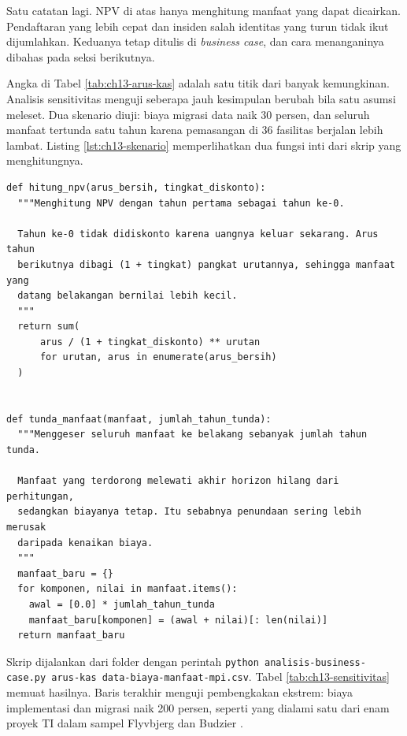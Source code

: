 Satu catatan lagi. NPV di atas hanya menghitung manfaat yang dapat dicairkan.
Pendaftaran yang lebih cepat dan insiden salah identitas yang turun tidak
ikut dijumlahkan. Keduanya tetap ditulis di \textit{business case}, dan cara
menanganinya dibahas pada seksi berikutnya.

\begin{pendalaman}[title={Pendalaman Teknis (opsional): Analisis Sensitivitas}]
Angka di Tabel \ref{tab:ch13-arus-kas} adalah satu titik dari banyak
kemungkinan. Analisis sensitivitas menguji seberapa jauh kesimpulan berubah
bila satu asumsi meleset. Dua skenario diuji: biaya migrasi data naik 30
persen, dan seluruh manfaat tertunda satu tahun karena pemasangan di 36
fasilitas berjalan lebih lambat. Listing \ref{lst:ch13-skenario} memperlihatkan
dua fungsi inti dari skrip yang menghitungnya.

\begin{lstlisting}[style=ch13python, caption={Fungsi penundaan manfaat dan NPV, tersedia di \berkas{sources/chapter13/analisis-business-case.py}}, label={lst:ch13-skenario}]
def hitung_npv(arus_bersih, tingkat_diskonto):
  """Menghitung NPV dengan tahun pertama sebagai tahun ke-0.

  Tahun ke-0 tidak didiskonto karena uangnya keluar sekarang. Arus tahun
  berikutnya dibagi (1 + tingkat) pangkat urutannya, sehingga manfaat yang
  datang belakangan bernilai lebih kecil.
  """
  return sum(
      arus / (1 + tingkat_diskonto) ** urutan
      for urutan, arus in enumerate(arus_bersih)
  )


def tunda_manfaat(manfaat, jumlah_tahun_tunda):
  """Menggeser seluruh manfaat ke belakang sebanyak jumlah tahun tunda.

  Manfaat yang terdorong melewati akhir horizon hilang dari perhitungan,
  sedangkan biayanya tetap. Itu sebabnya penundaan sering lebih merusak
  daripada kenaikan biaya.
  """
  manfaat_baru = {}
  for komponen, nilai in manfaat.items():
    awal = [0.0] * jumlah_tahun_tunda
    manfaat_baru[komponen] = (awal + nilai)[: len(nilai)]
  return manfaat_baru
\end{lstlisting}

Skrip dijalankan dari folder  dengan perintah
\texttt{python analisis-business-case.py arus-kas data-biaya-manfaat-mpi.csv}.
Tabel \ref{tab:ch13-sensitivitas} memuat hasilnya. Baris terakhir menguji
pembengkakan ekstrem: biaya implementasi dan migrasi naik 200 persen, seperti
yang dialami satu dari enam proyek TI dalam sampel Flyvbjerg dan Budzier
\cite{flyvbjerg2011}.


\end{pendalaman}
